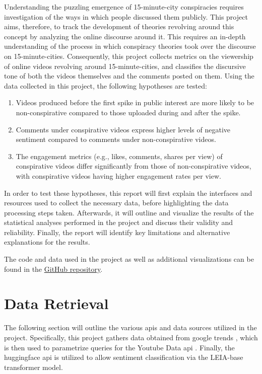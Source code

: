 \documentclass[fontsize=11pt, parskip=half]{scrartcl}
\begin{document}
    Understanding the puzzling emergence of 15-minute-city conspiracies requires investigation of the ways in which people discussed them publicly. This project aims, therefore, to track the development of theories revolving around this concept by analyzing the online discourse around it. This requires an in-depth understanding of the process in which conspiracy theories took over the discourse on 15-minute-cities. Consequently, this project collects metrics on the viewership of online videos revolving around 15-minute-cities, and classifies the discursive tone of both the videos themselves and the comments posted on them. Using the data collected in this project, the following hypotheses are tested: 

    \begin{enumerate}
        \item Videos produced before the first spike in public interest are more likely to be non-conspirative compared to those uploaded during and after the spike. \label{h:1}
        \item Comments under conspirative videos express higher levels of negative sentiment compared to comments under non-conspirative videos. \label{h:2}
        \item The engagement metrics (e.g., likes, comments, shares per view) of conspirative videos differ significantly from those of non-conspirative videos, with conspirative videos having higher engagement rates per view. \label{h:3}
    \end{enumerate}

In order to test these hypotheses, this report will first explain the interfaces and resources used to collect the necessary data, before highlighting the data processing steps taken. Afterwards, it will outline and visualize the results of the statistical analyses performed in the project and discuss their validity and reliability. Finally, the report will identify key limitations and alternative explanations for the results.

The code and data used in the project as well as additional visualizations can be found in the \href{https://github.com/julia-king-edu/so-24_smda_project}{GitHub repository}.
    
\section{Data Retrieval}
\label{section:retrieval}

    The following section will outline the various apis and data sources utilized in the project. Specifically, this project gathers data obtained from google trends \parencite{google15minuteCity2024}, which is then used to parametrize queries for the Youtube Data api \parencite{googlefordevelopersYoutubeDataApi2024}. Finally, the huggingface api \parencite{huggingfaceTransformers2024} is utilized to allow sentiment classification via the LEIA-base transformer model.
\end{document}
